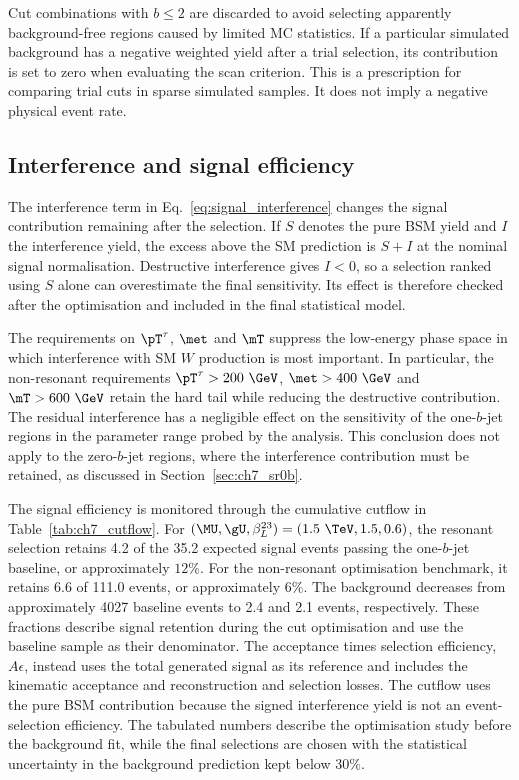 Cut combinations with $b\leq2$ are discarded to avoid selecting apparently background-free regions caused by limited MC statistics.
If a particular simulated background has a negative weighted yield after a trial selection, its contribution is set to zero when evaluating the scan criterion.
This is a prescription for comparing trial cuts in sparse simulated samples.
It does not imply a negative physical event rate.

\subsection{Interference and signal efficiency}
\label{subsec:ch7_efficiency}

The interference term in Eq.~\ref{eq:signal_interference} changes the signal contribution remaining after the selection.
If $S$ denotes the pure BSM yield and $I$ the interference yield, the excess above the SM prediction is $S+I$ at the nominal signal normalisation.
Destructive interference gives $I<0$, so a selection ranked using $S$ alone can overestimate the final sensitivity.
Its effect is therefore checked after the optimisation and included in the final statistical model.

The requirements on $\pT^\tau$, $\met$ and $\mT$ suppress the low-energy phase space in which interference with SM $W$ production is most important.
In particular, the non-resonant requirements $\pT^\tau>200~\GeV$, $\met>400~\GeV$ and $\mT>600~\GeV$ retain the hard tail while reducing the destructive contribution.
The residual interference has a negligible effect on the sensitivity of the one-$b$-jet regions in the parameter range probed by the analysis.
This conclusion does not apply to the zero-$b$-jet regions, where the interference contribution must be retained, as discussed in Section~\ref{sec:ch7_sr0b}.

The signal efficiency is monitored through the cumulative cutflow in Table~\ref{tab:ch7_cutflow}.
For $(\MU,\gU,\beta_L^{23})=(1.5~\TeV,1.5,0.6)$, the resonant selection retains 4.2 of the 35.2 expected signal events passing the one-$b$-jet baseline, or approximately $12\%$.
For the non-resonant optimisation benchmark, it retains 6.6 of 111.0 events, or approximately $6\%$.
The background decreases from approximately 4027 baseline events to 2.4 and 2.1 events, respectively.
These fractions describe signal retention during the cut optimisation and use the baseline sample as their denominator.
The acceptance times selection efficiency, $A\epsilon$, instead uses the total generated signal as its reference and includes the kinematic acceptance and reconstruction and selection losses.
The cutflow uses the pure BSM contribution because the signed interference yield is not an event-selection efficiency.
The tabulated numbers describe the optimisation study before the background fit, while the final selections are chosen with the statistical uncertainty in the background prediction kept below $30\%$.

